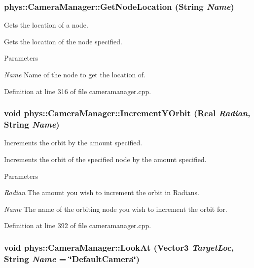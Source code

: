 \hypertarget{classphys_1_1CameraManager_af5fcec9bebd90b8e98b0d2f4def97ea1}{
\subsubsection[{GetNodeLocation}]{ phys::CameraManager::GetNodeLocation ({\bf String} {\em Name})}}
\label{d9/d91/classphys_1_1CameraManager_af5fcec9bebd90b8e98b0d2f4def97ea1}


Gets the location of a node. 

Gets the location of the node specified. 
\begin{DoxyParams}{Parameters}
\item[{\em Name}]Name of the node to get the location of. \end{DoxyParams}


Definition at line 316 of file cameramanager.cpp.

\hypertarget{classphys_1_1CameraManager_a82001f0874a090717ced3fbe78ce795b}{
\subsubsection[{IncrementYOrbit}]{\setlength{\rightskip}{0pt plus 5cm}void phys::CameraManager::IncrementYOrbit ({\bf Real} {\em Radian}, \/  {\bf String} {\em Name})}}
\label{d9/d91/classphys_1_1CameraManager_a82001f0874a090717ced3fbe78ce795b}


Increments the orbit by the amount specified. 

Increments the orbit of the specified node by the amount specified. 
\begin{DoxyParams}{Parameters}
\item[{\em Radian}]The amount you wish to increment the orbit in Radians. \item[{\em Name}]The name of the orbiting node you wish to increment the orbit for. \end{DoxyParams}


Definition at line 392 of file cameramanager.cpp.

\hypertarget{classphys_1_1CameraManager_a885a499a53c3543b6bf429583a2cb54c}{
\subsubsection[{LookAt}]{\setlength{\rightskip}{0pt plus 5cm}void phys::CameraManager::LookAt ({\bf Vector3} {\em TargetLoc}, \/  {\bf String} {\em Name} = {\ttfamily \char`\"{}DefaultCamera\char`\"{}})}}
\label{d9/d91/classphys_1_1CameraManager_a885a499a53c3543b6bf429583a2cb54c}


